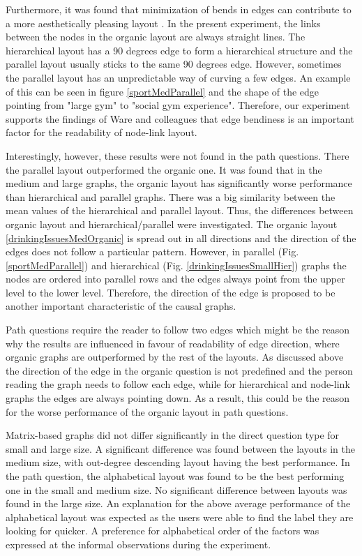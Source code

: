 \documentclass{l4proj}
\begin{document}
Furthermore, it was found that minimization of bends in edges can contribute to a more aesthetically pleasing layout \cite{ware2002cognitive}. In the present experiment, the links between the nodes in the organic layout are always straight lines. The hierarchical layout has a 90 degrees edge to form a hierarchical structure and the parallel layout usually sticks to the same 90 degrees edge. However, sometimes the parallel layout has an unpredictable way of curving a few edges. An example of this can be seen in figure \ref{sportMedParallel} and the shape of the edge pointing from "large gym" to "social gym experience". Therefore, our experiment supports the findings of Ware and colleagues \cite{ware2002cognitive} that edge bendiness is an important factor for the readability of node-link layout.

Interestingly, however, these results were not found in the path questions. There the parallel layout outperformed the organic one. It was found that in the medium and large graphs, the organic layout has significantly worse performance than hierarchical and parallel graphs. There was a big similarity between the mean values of the hierarchical and parallel layout. Thus, the differences between organic layout and hierarchical/parallel were investigated. The organic layout \ref{drinkingIssuesMedOrganic} is spread out in all directions and the direction of the edges does not follow a particular pattern. However, in parallel (Fig. \ref{sportMedParallel}) and hierarchical (Fig. \ref{drinkingIssuesSmallHier}) graphs the nodes are ordered into parallel rows and the edges always point from the upper level to the lower level. Therefore, the direction of the edge is proposed to be another important characteristic of the causal graphs. 

Path questions require the reader to follow two edges which might be the reason why the results are influenced in favour of readability of edge direction, where organic graphs are outperformed by the rest of the layouts. As discussed above the direction of the edge in the organic question is not predefined and the person reading the graph needs to follow each edge, while for hierarchical and node-link graphs the edges are always pointing down. As a result, this could be the reason for the worse performance of the organic layout in path questions.

Matrix-based graphs did not differ significantly in the direct question type for small and large size. A significant difference was found between the layouts in the medium size, with out-degree descending layout having the best performance. In the path question, the alphabetical layout was found to be the best performing one in the small and medium size. No significant difference between layouts was found in the large size. An explanation for the above average performance of the alphabetical layout was expected as the users were able to find the label they are looking for quicker. A preference for alphabetical order of the factors was expressed at the informal observations during the experiment.
\end{document}
